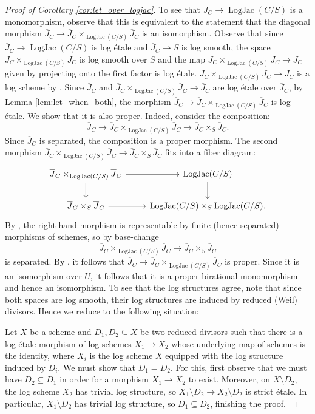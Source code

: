 \documentclass[11pt]{amsart}
\theoremstyle{definition}
\theoremstyle{remark}
\DeclareMathOperator{\LogJac}{LogJac}
\begin{document}
\begin{proof}[Proof of Corollary \ref{cor:let_over_logjac}]
	To see that $\overline{J}_C\to \LogJac(C/S)$
	is a monomorphism, observe that this is equivalent to the statement
	that the diagonal morphism
	$\overline{J}_C\to \overline{J}_C\times_{\LogJac(C/S)}\overline{J}_C$
	is an isomorphism. Observe that since $\overline{J}_C\to \LogJac(C/S)$ is log étale
	and $\overline{J}_C\to S$ is log smooth, the space $\overline{J}_C\times_{\LogJac(C/S)}\overline{J}_C$
	is log smooth over $S$ and the map $\overline{J}_C\times_{\LogJac(C/S)}\overline{J}_C\to \overline{J}_C$ given by projecting
	onto the first factor is log étale. $\overline{J}_C\times_{\LogJac(C/S)}\overline{J}_C\to \overline{J}_C$
	is a log scheme by \cite[Theorem 4.12.1]{TheLogarithmicMolcho2022}.
	Since $\overline{J}_C$ and $\overline{J}_C\times_{\LogJac(C/S)}\overline{J}_C\to \overline{J}_C$ are log étale over $\overline{J}_C$,
	by Lemma \ref{lem:let_when_both}, the morphism $\overline{J}_C\to \overline{J}_C\times_{\LogJac(C/S)}\overline{J}_C$
	is log étale. We show that it is also proper. Indeed, consider the composition:
	$$\overline{J}_C\to \overline{J}_C\times_{\LogJac(C/S)}\overline{J}_C\to \overline{J}_C\times_{S}\overline{J}_C.$$
	Since $\overline{J}_C$ is separated, the composition is a proper morphism. The second morphism
	$\overline{J}_C\times_{\LogJac(C/S)}\overline{J}_C\to \overline{J}_C\times_{S}\overline{J}_C$ fits into a fiber diagram:
	$$\begin{tikzcd}
		\overline{J}_C\times_{\LogJac(C/S)}\overline{J}_C\arrow[d]\arrow[r]&\LogJac(C/S)\arrow[d]\\
		\overline{J}_C\times_S \overline{J}_C\arrow[r]&\LogJac(C/S)\times_S \LogJac(C/S).
	\end{tikzcd}$$
	By \cite[Theorem 4.12.1]{TheLogarithmicMolcho2022}, the right-hand morphism is representable by finite (hence separated)
	morphisms of schemes, so by base-change
	$$\overline{J}_C\times_{\LogJac(C/S)}\overline{J}_C\to \overline{J}_C\times_{S}\overline{J}_C$$
	is separated. By \cite[Tag 01W6]{stacks-project}, it follows that $\overline{J}_C\to \overline{J}_C\times_{\LogJac(C/S)}\overline{J}_C$
	is proper. Since it is an isomorphism over $U$, it follows that it is a proper birational monomorphism and hence an isomorphism.
	To see that the log structures agree, note that since both spaces are log smooth, their log structures
	are induced by reduced (Weil) divisors. Hence we reduce to the following situation:

	Let $X$ be a scheme and $D_1,D_2\subseteq X$ be two reduced divisors such that there is a log étale morphism of log schemes
	$X_1\to X_2$ whose underlying map of schemes is the identity,
	where $X_i$ is the log scheme $X$ equipped with the log structure induced by $D_i$. We must show that $D_1=D_2$.
	For this, first observe that we must have $D_2\subseteq D_1$ in order for a morphism $X_1\to X_2$ to exist. Moreover,
	on $X\setminus D_2$, the log scheme $X_2$ has trivial log structure, so $X_1\setminus D_2\to X_2\setminus D_2$ is strict étale.
	In particular, $X_1\setminus D_2$ has trivial log structure, so $D_1\subseteq D_2$, finishing the proof.
\end{proof}
\end{document}
